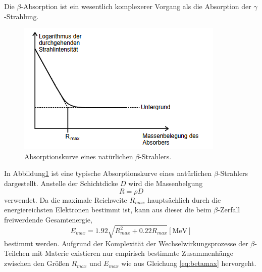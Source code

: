 Die $\beta$-Absorption ist ein wesentlich komplexerer Vorgang als die Absorption der $\gamma$-Strahlung.
\begin{figure}[H]
    \centering
    \includegraphics[scale=0.7]{content/Absorbbeta.png}
    \caption{Absorptionskurve eines natürlichen $\beta$-Strahlers. \cite{v704}}
    \label{fig:abs}
\end{figure}
\noindent
In Abbildung\ref{fig:abs} ist eine typische Absorptionskurve eines natürlichen $\beta$-Strahlers dargestellt.
Anstelle der Schichtdicke $D$ wird die Massenbelgung
\begin{equation}
  R = \rho D
\end{equation}
verwendet.
Da die maximale Reichweite $R_{max}$ hauptsächlich durch die energiereichsten Elektronen bestimmt ist, kann aus dieser die beim $\beta$-Zerfall freiwerdende Gesamtenergie,
\begin{equation}
    \label{eq:betamax}
  E_{max}= 1.92  \sqrt{R_{max}^2 +0.22R_{max}} [\si{\mega\electronvolt}]
\end{equation}
bestimmt werden.
Aufgrund der Komplexität der Wechselwirkungsprozesse der $\beta$-Teilchen mit Materie existieren nur empirisch bestimmte Zusammenhänge zwischen den Größen $R_{max}$ und $E_{max}$ wie aus Gleichung \eqref{eq:betamax} hervorgeht.
